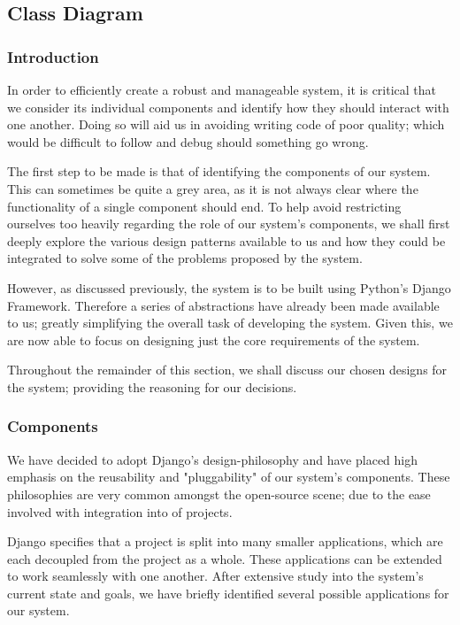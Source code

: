 \subsection{Class Diagram}
	\subsubsection{Introduction}
		In order to efficiently create a robust and manageable system, it is critical that we consider its individual components and identify how they should interact with one another. Doing so will aid us in avoiding writing code of poor quality; which would be difficult to follow and debug should something go wrong.
		
		The first step to be made is that of identifying the components of our system. This can sometimes be quite a grey area, as it is not always clear where the functionality of a single component should end. To help avoid restricting ourselves too heavily regarding the role of our system's components, we shall first deeply explore the various design patterns available to us and how they could be integrated to solve some of the problems proposed by the system.
	
		However, as discussed previously, the system is to be built using Python's Django Framework.  Therefore a series of abstractions have already been made available to us; greatly simplifying the overall task of developing the system. Given this, we are now able to focus on designing just the core requirements of the system.
		
		Throughout the remainder of this section, we shall discuss our chosen designs for the system; providing the reasoning for our decisions.
	
	\subsubsection{Components}
		We have decided to adopt Django's design-philosophy and have placed high emphasis on the reusability and "pluggability" of our system's components. These philosophies are very common amongst the open-source scene; due to the ease involved with integration into of projects.
		
		Django specifies that a project is split into many smaller applications, which are each decoupled from the project as a whole. These applications can be extended to work seamlessly with one another. After extensive study into the system's current state and goals, we have briefly identified several possible applications for our system.
		
